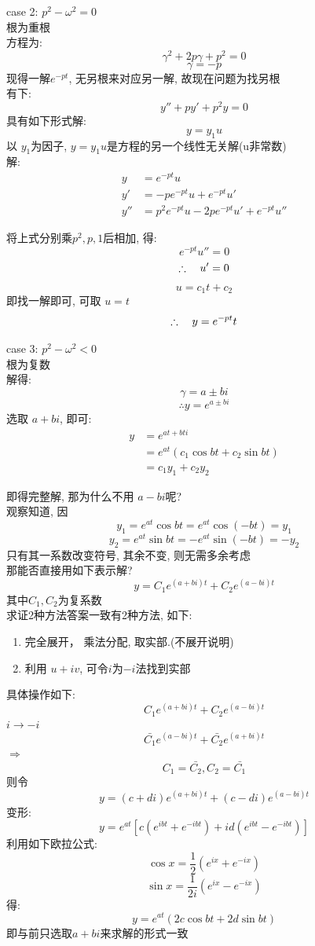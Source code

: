 case 2: $p^2 - \omega ^2 = 0$\\
根为重根\\
方程为:
\[ \gamma^2 + 2 p \gamma + p ^2 = 0 \]
\[ \gamma = - p \]
现得一解$e^{-pt}$, 无另根来对应另一解, 故现在问题为找另根\\
有下:
\[ y'' + p y' + p^2 y = 0 \]
具有如下形式解:
\[ y = y_1 u \]
以 $y_1$为因子, $y = y_1 u$是方程的另一个线性无关解(u非常数)\\
解:
\begin{align*}
    y  &= e^{-pt} u\\
    y' &= -p e^{-pt} u + e^{-pt} u' \\
    y''&= p^2 e^{-pt} u -2p e^{-pt} u' + e^{-pt} u'' 
\end{align*}

将上式分别乘$p^2, p, 1$后相加, 得:
\[ e^{-pt} u'' = 0 \]
\[ \therefore \hspace*{1em} u' = 0 \]
\[ u = c_1 t+ c_2  \]
即找一解即可, 可取 $u = t$
\[ \therefore \hspace*{1em}  y = e^{-pt} t \]


case 3: $p^2 - \omega ^2 < 0$\\
根为复数\\
解得:
\[ \gamma = a \pm b i \]
\[ \therefore y = e^{ a \pm b i} \]
选取 $ a + b i $, 即可:
\begin{align*}
    y  &= e^{at + b t i} \\
       &= e^{at} (c_1 \cos bt + c_2 \sin bt)\\
       &= c_1 y_1 + c_2 y_2 
\end{align*}

即得完整解, 那为什么不用 $a - b i$呢?\\
观察知道, 因
\[ y_1 = e^{at} \cos bt = e^{at} \cos (-bt) = y_1 \]
\[ y_2 = e^{at} \sin bt = - e^{at} \sin (-bt) = -y_2 \]
只有其一系数改变符号, 其余不变, 则无需多余考虑\\
那能否直接用如下表示解?
\[ y = C_1 e^{(a + b i) t} + C_2 e^{(a - b i) t} \]
其中$C_1, C_2$为复系数\\
求证2种方法答案一致有2种方法, 如下:
\begin{enumerate}
    \item 完全展开， 乘法分配, 取实部.(不展开说明)
    \item 利用 $u + i v$, 可令$i$为$-i$法找到实部
\end{enumerate}

具体操作如下:
\[ C_1 e^{(a + b i) t} + C_2 e^{(a - b i) t} \]
$i \rightarrow -i $
\[ \bar{C_1} e^{(a - b i) t} + \bar{C_2} e^{(a + b i) t} \]
$\Rightarrow $
\[ C_1 = \bar{C_2} , C_2 = \bar{C_1} \]
则令
\[ y = (c + di) e^{(a + b i) t} + (c - di) e^{(a - b i) t} \]
变形:
\[ y = e^{at} [c (e^{ibt} + e^{-ibt}) + i d (e^{ibt} - e^{-ibt})] \]
利用如下欧拉公式:
\[ \cos x = \frac{1}{2} (e^{ix} + e^{-ix}) \]
\[ \sin x = \frac{1}{2i} (e^{ix} - e^{-ix}) \]
得:
\[ y = e^{at} (2c \cos bt + 2d \sin bt) \]
即与前只选取$a + bi$来求解的形式一致

